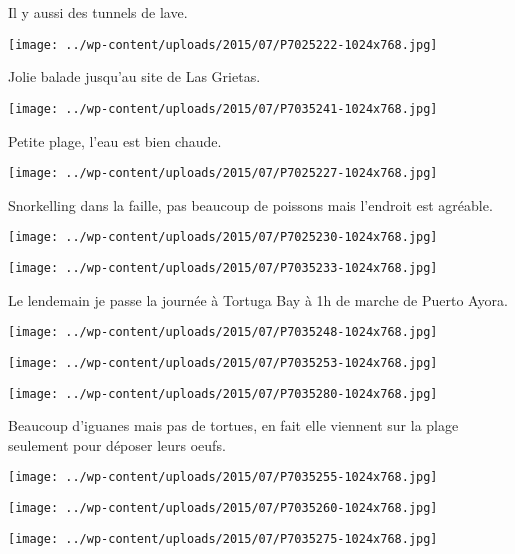 Il y aussi des tunnels de lave. 
\begin{center} \texttt{[image: ../wp-content/uploads/2015/07/P7025222-1024x768.jpg]} \end{center}

Jolie balade jusqu'au site de Las Grietas. 
\begin{center} \texttt{[image: ../wp-content/uploads/2015/07/P7035241-1024x768.jpg]} \end{center}
\pagebreak

Petite plage, l'eau est bien chaude. 
\begin{center} \texttt{[image: ../wp-content/uploads/2015/07/P7025227-1024x768.jpg]} \end{center}

Snorkelling dans la faille, pas beaucoup de poissons mais l'endroit est agréable. 
\begin{center} \texttt{[image: ../wp-content/uploads/2015/07/P7025230-1024x768.jpg]} \end{center}
\begin{center} \texttt{[image: ../wp-content/uploads/2015/07/P7035233-1024x768.jpg]} \end{center}

Le lendemain je passe la journée à Tortuga Bay à 1h de marche de Puerto Ayora. 
\begin{center} \texttt{[image: ../wp-content/uploads/2015/07/P7035248-1024x768.jpg]} \end{center}
\begin{center} \texttt{[image: ../wp-content/uploads/2015/07/P7035253-1024x768.jpg]} \end{center}
\begin{center} \texttt{[image: ../wp-content/uploads/2015/07/P7035280-1024x768.jpg]} \end{center}
\pagebreak

Beaucoup d'iguanes mais pas de tortues, en fait elle viennent sur la plage seulement pour déposer leurs oeufs. 
\begin{center} \texttt{[image: ../wp-content/uploads/2015/07/P7035255-1024x768.jpg]} \end{center}
\begin{center} \texttt{[image: ../wp-content/uploads/2015/07/P7035260-1024x768.jpg]} \end{center}
\begin{center} \texttt{[image: ../wp-content/uploads/2015/07/P7035275-1024x768.jpg]} \end{center}

